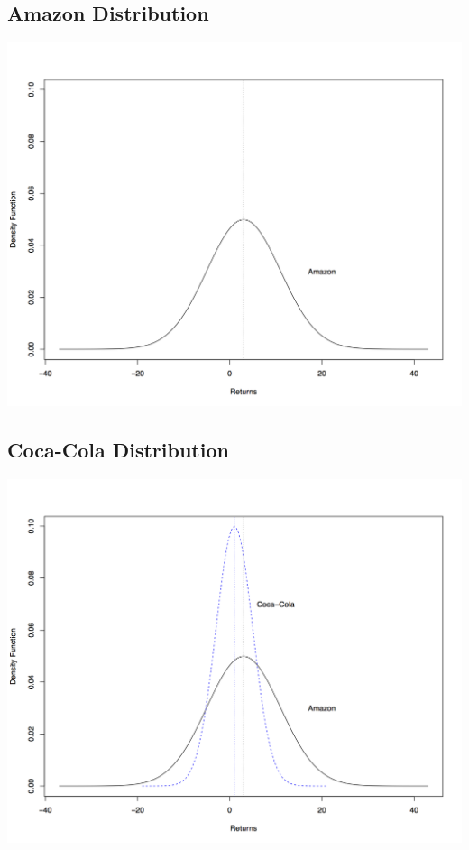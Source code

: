 \documentclass[letterpaper,10pt,english]{sphinxmanual}
\begin{document}
\subsection{Amazon Distribution}
\label{risk:amazon-distribution}
\includegraphics[width=6in]{amazon.png}


\subsection{Coca-Cola Distribution}
\label{risk:coca-cola-distribution}
\includegraphics[width=6in]{amazon_coke.png}
\end{document}
